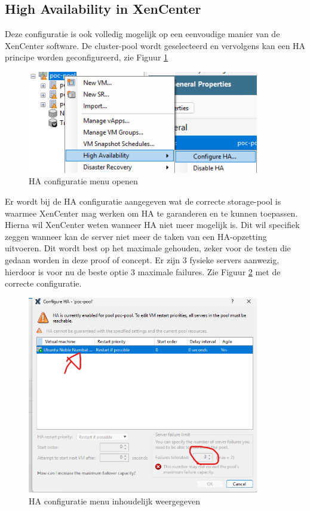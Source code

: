 \subsection{High Availability in XenCenter}%
\label{sec:HA-xen}
Deze configuratie is ook volledig mogelijk op een eenvoudige manier van de XenCenter software.
De cluster-pool wordt geselecteerd en vervolgens kan een HA principe worden geconfigureerd, zie Figuur \ref{fig:ha-settiings1.png}
\begin{figure}[H]
  \centering
  \includegraphics[width=0.9\textwidth]{../poc/ha-settiings1.png}
  \caption{HA configuratie menu openen}
  \label{fig:ha-settiings1.png}
\end{figure}
Er wordt bij de HA configuratie aangegeven wat de correcte storage-pool is waarmee XenCenter mag werken om HA te garanderen en te kunnen toepassen.
Hierna wil XenCenter weten wanneer HA niet meer mogelijk is. Dit wil specifiek zeggen wanneer kan de server niet meer de taken van een HA-opzetting uitvoeren. 
Dit wordt best op het maximale gehouden, zeker voor de testen die gedaan worden in deze proof of concept. Er zijn 3 fysieke servers aanwezig, hierdoor is voor nu de beste optie 3 maximale failures.
Zie Figuur \ref{fig:haconf2-xen} met de correcte configuratie.
\begin{figure}[H]
  \centering
  \includegraphics[width=0.9\textwidth]{../poc/haconf2-xen.png}
  \caption{HA configuratie menu inhoudelijk weergegeven}
  \label{fig:haconf2-xen}
\end{figure}
